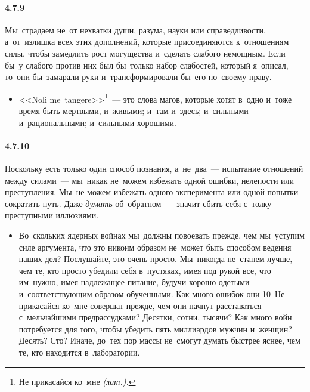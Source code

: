 \paragraph{4.7.9}\hypertarget{par:4.7.9}{} Мы~страдаем не~от нехватки души, разума, науки или справедливости, а~от~излишка всех этих дополнений, которые присоединяются к~отношениям силы, чтобы замедлить рост могущества и~сделать слабого немощным. Если бы~у слабого против них был бы~только набор слабостей, который я~описал, то~они бы~замарали руки и~трансформировали бы~его по~своему нраву. 
	\begin{itemize}
	\item 
	<<Noli me~tangere>>\footnote{Не прикасайся ко~мне {\itshape(лат.).}}~--- это слова магов, которые хотят в~одно и~тоже время быть мертвыми, и~живыми; и~там и~здесь; и~сильными и~рациональными; и~сильными хорошими.
	\end{itemize}	

\paragraph{4.7.10}\hypertarget{par:4.7.10}{}Поскольку есть только один способ познания, а~не~два~--- испытание отношений между силами~--- мы~никак не~можем избежать одной ошибки, нелепости или преступления. Мы~не можем избежать одного эксперимента или одной попытки сократить путь. Даже {\itshape думать} об~обратном~--- значит сбить себя с~толку преступными иллюзиями. 
	\begin{itemize}
	\item 
 Во~скольких ядерных войнах мы~должны повоевать прежде, чем мы~уступим силе аргумента, что это никоим образом не~может быть способом ведения наших дел? Послушайте, это очень просто. Мы~никогда не~станем лучше, чем те, кто просто убедили себя в~пустяках, имея под рукой все, что им~нужно, имея надлежащее питание, будучи хорошо одетыми и~соответствующим образом обученными. Как много ошибок они 10~Не прикасайся ко~мне  совершат прежде, чем они начнут расставаться с~мельчайшими предрассудками? Десятки, сотни, тысячи? Как много войн потребуется для того, чтобы убедить пять миллиардов мужчин и~женщин? Десять? Сто? Иначе, до~тех пор массы не~смогут думать быстрее яснее, чем те, кто находится в~лаборатории.
	\end{itemize}	


